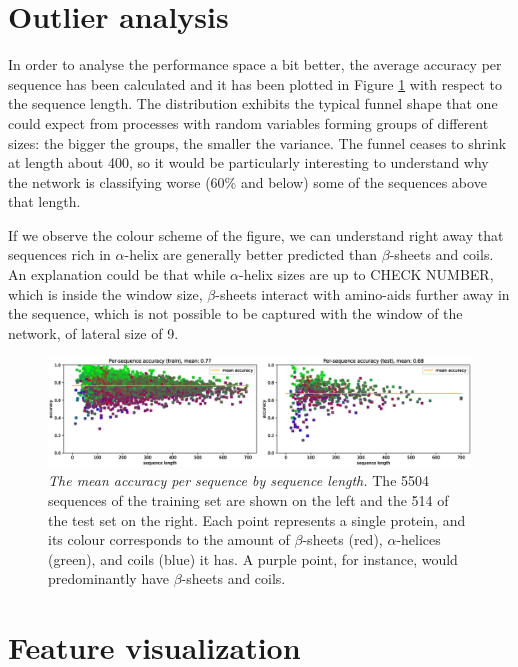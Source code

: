 \section{Outlier analysis} \label{sect:outliers}

In order to analyse the performance space a bit better, the average accuracy per sequence has been calculated and it has been plotted in Figure \ref{fig:per_seq_acc} with respect to the sequence length. The distribution exhibits the typical funnel shape that one could expect from processes with random variables forming groups of different sizes: the bigger the groups, the smaller the variance. The funnel ceases to shrink at length about 400, so it would be particularly interesting to understand why the network is classifying worse (60\% and below) some of the sequences above that length.

If we observe the colour scheme of the figure, we can understand right away that sequences rich in $\alpha$-helix are generally better predicted than $\beta$-sheets and coils. An explanation could be that while $\alpha$-helix sizes are up to CHECK NUMBER, which is inside the window size, $\beta$-sheets interact with amino-aids further away in the sequence, which is not possible to be captured with the window of the network, of lateral size of 9.

\begin{figure}
\centering
\includegraphics[width=1\linewidth]{Figures/per_seq_acc}
\caption{\textit{The mean accuracy per sequence by sequence length.} The 5504 sequences of the training set are shown on the left and the 514 of the test set on the right. Each point represents a single protein, and its colour corresponds to the amount of $\beta$-sheets (red), $\alpha$-helices (green), and coils (blue) it has. A purple point, for instance, would predominantly have $\beta$-sheets and coils.}
\label{fig:per_seq_acc}
\end{figure}

\section{Feature visualization}

